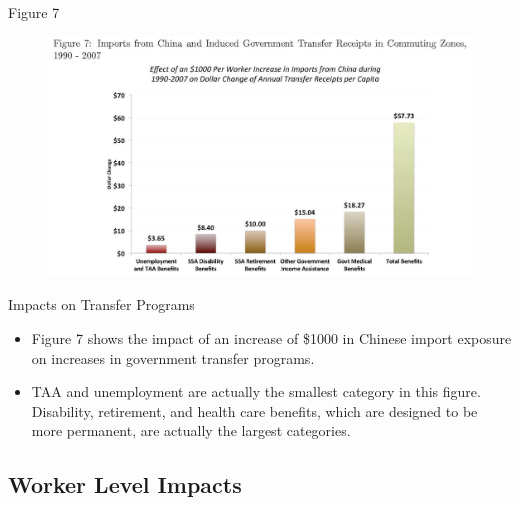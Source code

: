 \documentclass[aspectratio=169]{beamer}
\begin{document}

\begin{frame}{Figure 7}

\begin{figure}
    \centering
    \includegraphics[scale=0.7]{AutorDornHansonFig7.jpg}
    \label{fig:Fig7}
\end{figure}
    
\end{frame}


\begin{frame}{Impacts on Transfer Programs}

\begin{itemize}
    \item<1-> Figure 7 shows the impact of an increase of \$1000 in Chinese import exposure on increases in government transfer programs.
    \item<2-> TAA and unemployment are actually the smallest category in this figure.  Disability, retirement, and health care benefits, which are designed to be more permanent, are actually the largest categories.
\end{itemize}
    
\end{frame}


\subsection{Worker Level Impacts}

\end{document}
